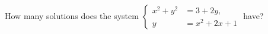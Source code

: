 How many solutions does the system $\left\{\begin{aligned} x^{2}+y^{2} &=3+2y, \\ y &=x^{2}+2x+1 \end{aligned}\right.$ have?
